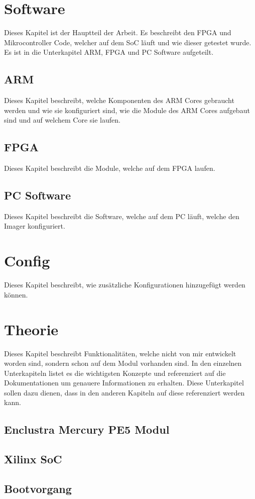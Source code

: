 \documentclass{article}
\begin{document}
\section{Software}
Dieses Kapitel ist der Hauptteil der Arbeit. Es beschreibt den FPGA und Mikrocontroller Code, welcher auf dem SoC läuft und wie dieser getestet wurde. Es ist in die Unterkapitel ARM, FPGA und PC Software aufgeteilt.
\subsection{ARM}
Dieses Kapitel beschreibt, welche Komponenten des ARM Cores gebraucht werden und wie sie konfiguriert sind, wie die Module des ARM Cores aufgebaut sind und auf welchem Core sie laufen.
\subsection{FPGA}
Dieses Kapitel beschreibt die Module, welche auf dem FPGA laufen.
\subsection{PC Software}
Dieses Kapitel beschreibt die Software, welche auf dem PC läuft, welche den Imager konfiguriert.


\section{Config}
Dieses Kapitel beschreibt, wie zusätzliche Konfigurationen hinzugefügt werden können.

\section{Theorie}
Dieses Kapitel beschreibt Funktionalitäten, welche nicht von mir entwickelt worden sind, sondern schon auf dem Modul vorhanden sind. In den einzelnen Unterkapiteln listet es die wichtigsten Konzepte und referenziert auf die Dokumentationen um genauere Informationen zu erhalten. Diese Unterkapitel sollen dazu dienen, dass in den anderen Kapiteln auf diese referenziert werden kann.
\subsection{Enclustra Mercury PE5 Modul}
\subsection{Xilinx SoC}
\subsection{Bootvorgang}
\end{document}
